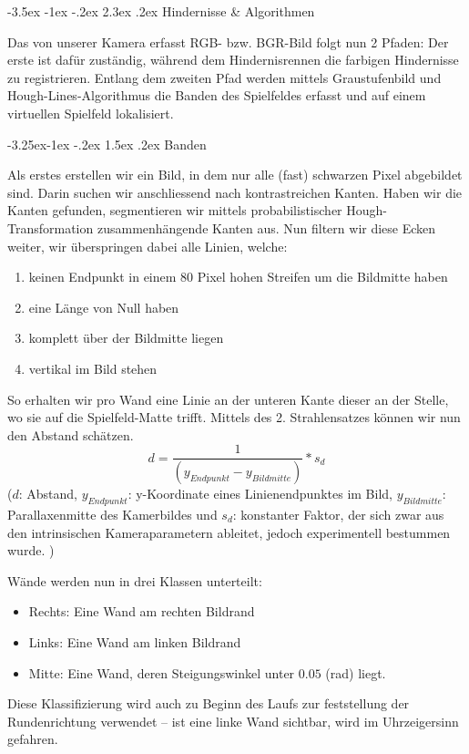\documentclass[a4paper]{scrarticle}
\makeatletter
\renewcommand\section{\@startsection {section}{1}{\z@}%
                                   {-3.5ex \@plus -1ex \@minus -.2ex}%
                                   {2.3ex \@plus.2ex}%
                                   {\Huge\AKAfont}}
\renewcommand\subsection{\@startsection{subsection}{2}{\z@}%
                                     {-3.25ex\@plus -1ex \@minus -.2ex}%
                                     {1.5ex \@plus .2ex}%
                                     {\Large\AKAfont}}
\makeatother
\begin{document}
\section{Hindernisse \& Algorithmen}

Das von unserer Kamera erfasst RGB- bzw. BGR-Bild folgt nun 2 Pfaden: Der erste ist dafür zuständig, während dem Hindernisrennen die farbigen Hindernisse zu registrieren. Entlang dem zweiten Pfad werden mittels Graustufenbild und Hough-Lines-Algorithmus die Banden des Spielfeldes erfasst und auf einem virtuellen Spielfeld lokalisiert.

\subsection{Banden}

Als erstes erstellen wir ein Bild, in dem nur alle (fast) schwarzen Pixel abgebildet sind. Darin suchen wir anschliessend nach kontrastreichen Kanten.
Haben wir die Kanten gefunden, segmentieren wir mittels probabilistischer Hough-Transformation zusammenhängende Kanten aus.
Nun filtern wir diese Ecken weiter, wir überspringen dabei alle Linien, welche:
\begin{enumerate}
	\item {keinen Endpunkt in einem 80 Pixel hohen Streifen um die Bildmitte haben}
	\item {eine Länge von Null haben}
	\item {komplett über der Bildmitte liegen}
	\item {vertikal im Bild stehen}
\end{enumerate}
So erhalten wir pro Wand eine Linie an der unteren Kante dieser an der Stelle, wo sie auf die Spielfeld-Matte trifft.
Mittels des 2. Strahlensatzes können wir nun den Abstand schätzen.
$$
d = \frac{1}{(y_{Endpunkt}-y_{Bildmitte})} * s_d
$$
($d$: Abstand, $y_{Endpunkt}$: y-Koordinate eines Linienendpunktes im Bild, $y_{Bildmitte}$: Parallaxenmitte des Kamerbildes und $s_d$: konstanter Faktor, der sich zwar aus den intrinsischen Kameraparametern ableitet, jedoch experimentell bestummen wurde. )

Wände werden nun in drei Klassen unterteilt:
\begin{itemize}
	\item Rechts: Eine Wand am rechten Bildrand
	\item Links: Eine Wand am linken Bildrand
	\item Mitte: Eine Wand, deren Steigungswinkel unter $0.05$ (rad) liegt.
\end{itemize}
Diese Klassifizierung wird auch zu Beginn des Laufs zur feststellung der Rundenrichtung verwendet – ist eine linke Wand sichtbar, wird im Uhrzeigersinn gefahren.
\end{document}
